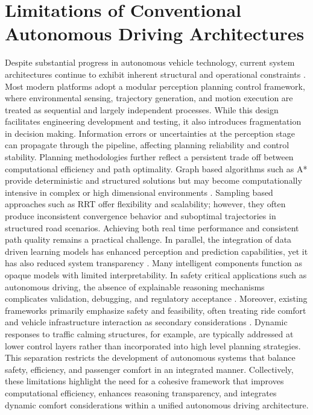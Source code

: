 \documentclass[a4paper,12pt,one side]{report}
\theoremstyle{definition}
\begin{document}
\section{Limitations of Conventional Autonomous Driving Architectures}
Despite substantial progress in autonomous vehicle technology, current system architectures continue to exhibit inherent structural and operational constraints \cite{waymo2017road}. Most modern platforms adopt a modular perception planning control framework, where environmental sensing, trajectory generation, and motion execution are treated as sequential and largely independent processes. While this design facilitates engineering development and testing, it also introduces fragmentation in decision making. Information errors or uncertainties at the perception stage can propagate through the pipeline, affecting planning reliability and control stability.
Planning methodologies further reflect a persistent trade off between computational efficiency and path optimality. Graph based algorithms such as A* provide deterministic and structured solutions but may become computationally intensive in complex or high dimensional environments \cite{guruji2016time}. Sampling based approaches such as RRT offer flexibility and scalability; however, they often produce inconsistent convergence behavior and suboptimal trajectories in structured road scenarios. Achieving both real time performance and consistent path quality remains a practical challenge.
In parallel, the integration of data driven learning models has enhanced perception and prediction capabilities, yet it has also reduced system transparency \cite{tekkesinoglu2025advancing}. Many intelligent components function as opaque models with limited interpretability. In safety critical applications such as autonomous driving, the absence of explainable reasoning mechanisms complicates validation, debugging, and regulatory acceptance \cite{corso2020interpretable}.
Moreover, existing frameworks primarily emphasize safety and feasibility, often treating ride comfort and vehicle infrastructure interaction as secondary considerations \cite{fernandez2021trustworthy}. Dynamic responses to traffic calming structures, for example, are typically addressed at lower control layers rather than incorporated into high level planning strategies. This separation restricts the development of autonomous systems that balance safety, efficiency, and passenger comfort in an integrated manner.
Collectively, these limitations highlight the need for a cohesive framework that improves computational efficiency, enhances reasoning transparency, and integrates dynamic comfort considerations within a unified autonomous driving architecture.
\end{document}
